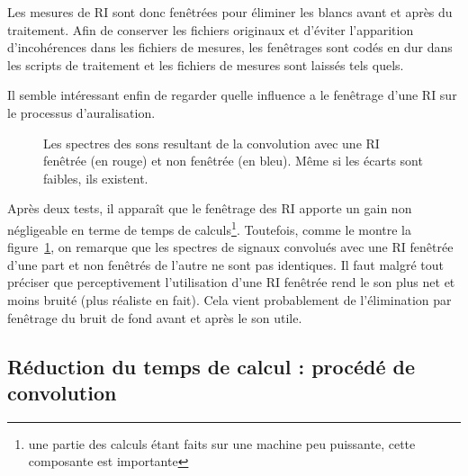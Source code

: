 Les mesures de RI sont donc fenêtrées pour éliminer les blancs avant et après du traitement. Afin de conserver les
fichiers originaux et d'éviter l'apparition d'incohérences dans les fichiers de mesures, les fenêtrages sont codés en
dur dans les scripts de traitement et les fichiers de mesures sont laissés tels quels.

Il semble intéressant enfin de regarder quelle influence a le fenêtrage d'une RI sur le processus d'auralisation.

\begin{figure}[h!]
\caption{\label{spectres_recoupage}Les spectres des sons resultant de la convolution avec une RI fenêtrée (en rouge) et
non fenêtrée (en bleu). Même si les écarts sont faibles, ils existent.}
\end{figure}

Après deux tests, il apparaît que le fenêtrage des RI apporte un gain non négligeable en terme de temps de
calculs\footnote{une partie des calculs étant faits sur une machine peu puissante, cette composante est importante}.
Toutefois, comme le montre la figure~\ref{spectres_recoupage}, on remarque que les spectres de signaux convolués avec
une RI fenêtrée d'une part et non fenêtrés de l'autre ne sont pas identiques. Il faut malgré tout préciser que
perceptivement l'utilisation d'une RI fenêtrée rend le son plus net et moins bruité (plus réaliste en fait). Cela vient
probablement de l'élimination par fenêtrage du bruit de fond avant et après le son utile.

\subsection{Réduction du temps de calcul : procédé de convolution} %

